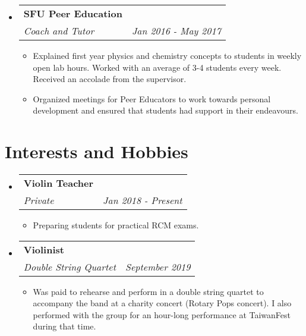 \documentclass[letterpaper, 11pt]{article}
\makeatletter
\newcommand{\resitem}[1]{\item #1 \vspace{-2pt}}
\newcommand{\ressubheading}[4]{
	\begin{tabular*}{6.5in}{l@{\extracolsep{\fill}}r}
		\textbf{#1} & #2 \\
		\textit{#3} & \textit{#4} \\
	\end{tabular*}\vspace{-6pt}}
\makeatother
\begin{document}
\begin{itemize}
\item
\ressubheading{SFU Peer Education}{}{Coach and Tutor}{Jan 2016 - May 2017}
\begin{itemize}
\resitem{Explained first year physics and chemistry concepts to students in weekly open lab hours. Worked with an average of 3-4 students every week. Received an accolade from the supervisor.}
\resitem{Organized meetings for Peer Educators to work towards personal development and ensured that students had support in their endeavours.}
\end{itemize}

\end{itemize}

\section*{Interests and Hobbies}

\begin{itemize}
\item
\ressubheading{Violin Teacher}{}{Private}{Jan 2018 - Present}
\begin{itemize}
\resitem{Preparing students for practical RCM exams.}
\end{itemize}

\item
\ressubheading{Violinist}{}{Double String Quartet}{September 2019}
\begin{itemize}
\resitem{Was paid to rehearse and perform in a double string quartet to accompany the band at a charity concert (Rotary Pops concert). I also performed with the group for an hour-long performance at TaiwanFest during that time.}
\end{itemize}



\end{itemize}
\end{document}
